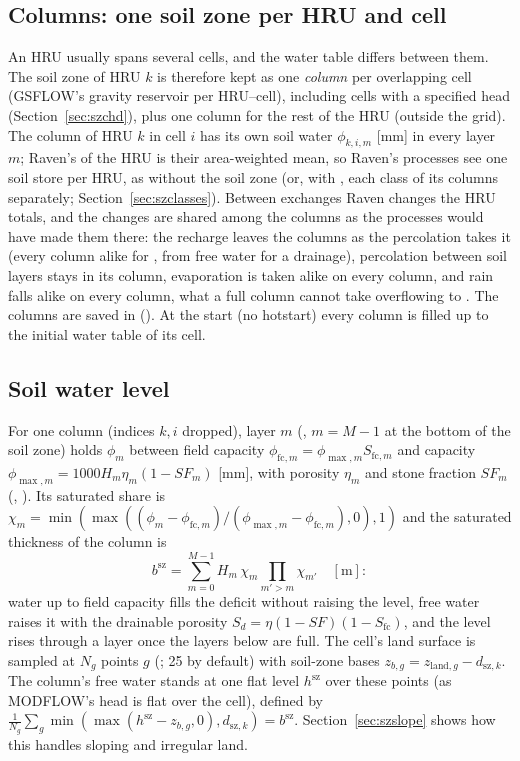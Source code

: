 \subsection{Columns: one soil zone per HRU and cell}
An HRU usually spans several cells, and the water table differs between them. The soil zone of HRU $k$ is therefore kept
as one \emph{column} per overlapping cell (GSFLOW's gravity reservoir per HRU--cell), including cells with a specified
head (Section~\ref{sec:szchd}), plus one column for the rest of the HRU (outside the grid). The column of HRU $k$ in cell $i$ has its own soil water $\phi_{k,i,m}$ [mm] in every layer $m$;
Raven's  of the HRU is their area-weighted mean, so Raven's processes see one soil store per HRU, as
without the soil zone (or, with
, each class of its columns separately; Section~\ref{sec:szclasses}). Between
exchanges Raven changes the HRU totals, and the changes are shared among the columns as the processes would have made
them there: the recharge leaves the columns as the percolation takes it (every column alike for ,
from free water for a drainage), percolation between soil layers stays in its column, evaporation is taken alike on
every column, and rain falls alike on every column, what a full column cannot take overflowing to
. The columns are saved in
 (). At the start (no hotstart) every column is filled up to the initial water
table of its cell.

\subsection{Soil water level}
For one column (indices $k,i$ dropped), layer $m$ (, $m=M-1$ at the bottom of the soil zone) holds $\phi_m$
between field capacity $\phi_{\mathrm{fc},m}=\phi_{\max,m}S_{\mathrm{fc},m}$ and capacity
$\phi_{\max,m}=1000H_m\eta_m(1-\mathit{SF}_m)$ [mm], with porosity $\eta_m$ and stone fraction $\mathit{SF}_m$
(, ). Its saturated share is
$\chi_m=\min(\max((\phi_m-\phi_{\mathrm{fc},m})/(\phi_{\max,m}-\phi_{\mathrm{fc},m}),0),1)$ and the saturated thickness of the
column is
\begin{equation}
b^{\mathrm{sz}}=\sum_{m=0}^{M-1}H_m\,\chi_m\prod_{m'>m}\chi_{m'}\quad[\mathrm m]:
\end{equation}
water up to field capacity fills the deficit without raising the level, free water raises it with the drainable porosity
$S_d=\eta(1-\mathit{SF})(1-S_{\mathrm{fc}})$, and the level rises through a layer once the layers below are full. The cell's land
surface is sampled at $N_g$ points $g$ (; 25 by default) with soil-zone bases
$z_{b,g}=z_{\mathrm{land},g}-d_{\mathrm{sz},k}$. The column's free water stands at one flat level $h^{\mathrm{sz}}$ over these points (as MODFLOW's
head is flat over the cell), defined by $\frac1{N_g}\sum_g\min(\max(h^{\mathrm{sz}}-z_{b,g},0),d_{\mathrm{sz},k})=b^{\mathrm{sz}}$. Section~\ref{sec:szslope} shows how this handles sloping and irregular land.

